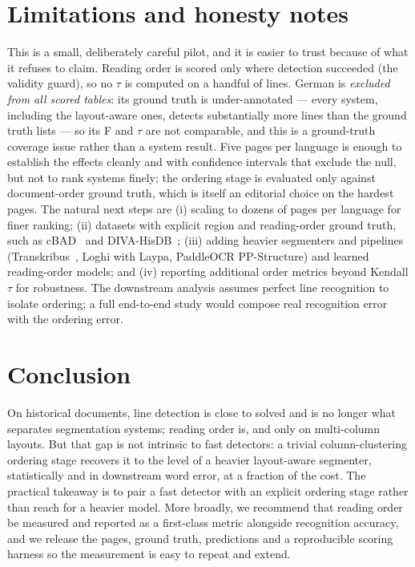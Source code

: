 \documentclass[11pt]{article}
\newcommand{\tw}{\ensuremath{\tau}}
\begin{document}
\section{Limitations and honesty notes}
\label{sec:honesty}

This is a small, deliberately careful pilot, and it is easier to trust because of
what it refuses to claim. Reading order is scored only where detection succeeded
(the validity guard), so no \tw{} is computed on a handful of lines. German is
\emph{excluded from all scored tables}: its ground truth is under-annotated ---
every system, including the layout-aware ones, detects substantially more lines
than the ground truth lists --- so its F and \tw{} are not comparable, and this is
a ground-truth coverage issue rather than a system result. Five pages per language
is enough to establish the effects cleanly and with confidence intervals that
exclude the null, but not to rank systems finely; the ordering stage is evaluated
only against document-order ground truth, which is itself an editorial choice on
the hardest pages. The natural next steps are (i) scaling to dozens of pages per
language for finer ranking; (ii) datasets with explicit region and reading-order
ground truth, such as cBAD~\cite{cbad} and DIVA-HisDB~\cite{divahisdb}; (iii)
adding heavier segmenters and pipelines (Transkribus~\cite{transkribus}, Loghi
with Laypa, PaddleOCR PP-Structure) and learned reading-order models; and (iv)
reporting additional order metrics beyond Kendall \tw{} for robustness. The
downstream analysis assumes perfect line recognition to isolate ordering; a full
end-to-end study would compose real recognition error with the ordering error.

\section{Conclusion}

On historical documents, line detection is close to solved and is no longer what
separates segmentation systems; reading order is, and only on multi-column
layouts. But that gap is not intrinsic to fast detectors: a trivial
column-clustering ordering stage recovers it to the level of a heavier
layout-aware segmenter, statistically and in downstream word error, at a fraction
of the cost. The practical takeaway is to pair a fast detector with an explicit
ordering stage rather than reach for a heavier model. More broadly, we recommend
that reading order be measured and reported as a first-class metric alongside
recognition accuracy, and we release the pages, ground truth, predictions and a
reproducible scoring harness so the measurement is easy to repeat and extend.
\end{document}
